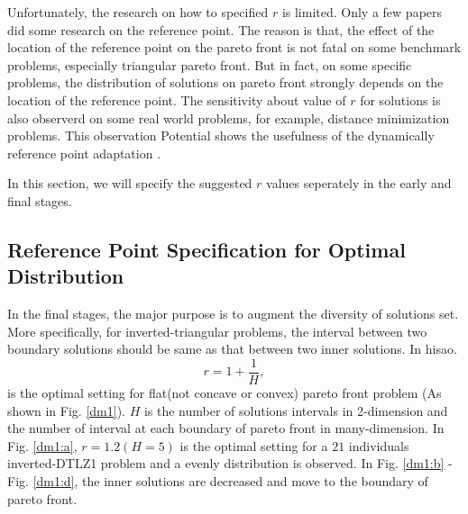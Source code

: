 \documentclass[conference]{IEEEtran}
\begin{document}
Unfortunately, the research on how to specified $r$ is limited.
Only a few papers\cite{hisao1, hisao2, hisao3, zhangqingfuHypE} 
did some research on the reference point. 
The reason is that, the effect of the location of the reference point on the pareto front 
is not fatal on some benchmark problems, especially triangular pareto front. 
But in fact, on some specific problems, the distribution of solutions on pareto front
strongly depends on the location of the reference point. 
The sensitivity about value of $r$ for solutions is also observerd on some real world problems,
for example, distance minimization problems.
This observation Potential shows the usefulness of the dynamically reference point adaptation
\cite{hisao}.

In this section, we will specify the suggested $r$ values seperately
in the early and final stages.

%
\subsection{Reference Point Specification for Optimal Distribution}
In the final stages, the major purpose is to augment the diversity of solutions set.
More specifically, for inverted-triangular problems, 
the interval between two boundary solutions should be same as that between two inner solutions.
In hisao\cite{hisao}.%
\begin{equation}\label{eod}
  r=1+\frac{1}{H},
\end{equation}
is the optimal setting for flat(not concave or convex) pareto front problem
(As shown in Fig. \ref{dm1}). $H$ is the number of solutions intervals in 2-dimension 
and the number of interval at each boundary of pareto front in many-dimension.
In Fig. \ref{dm1:a}, $r=1.2(H=5)$ is the optimal setting for a $21$ individuals 
inverted-DTLZ1 problem and a evenly distribution is observed. 
In Fig. \ref{dm1:b} - Fig. \ref{dm1:d}, the inner solutions are decreased and move to
the boundary of pareto front. 
\end{document}
